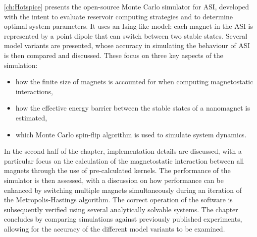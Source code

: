 \cref{ch:Hotspice} presents the open-source \hotspice Monte Carlo simulator for ASI, developed with the intent to evaluate reservoir computing strategies and to determine optimal system parameters.
It uses an Ising-like model: each magnet in the ASI is represented by a point dipole that can switch between two stable states.
Several model variants are presented, whose accuracy in simulating the behaviour of ASI is then compared and discussed.
These focus on three key aspects of the simulation:
\begin{itemize}[noitemsep,nolistsep] %
	\item how the finite size of magnets is accounted for when computing magnetostatic interactions,
	\item how the effective energy barrier between the stable states of a nanomagnet is estimated,
	\item which Monte Carlo spin-flip algorithm is used to simulate system dynamics.
\end{itemize}
In the second half of the chapter, implementation details are discussed, with a particular focus on the calculation of the magnetostatic interaction between all magnets through the use of pre-calculated kernels.
The performance of the simulator is then assessed, with a discussion on how performance can be enhanced by switching multiple magnets simultaneously during an iteration of the Metropolis-Hastings algorithm.
The correct operation of the software is subsequently verified using several analytically solvable systems.
The chapter concludes by comparing simulations against previously published experiments, allowing for the accuracy of the different model variants to be examined. \\

